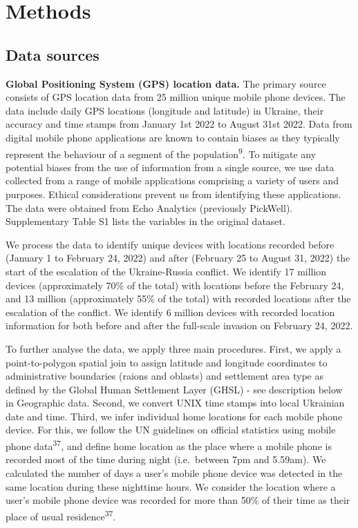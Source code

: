\documentclass[
  11pt,
]{article}
\begin{document}
\section{Methods}\label{methods}

\subsection{Data sources}\label{sec-data-sources}

\textbf{Global Positioning System (GPS) location data.} The primary
source consists of GPS location data from 25 million unique mobile phone
devices. The data include daily GPS locations (longitude and latitude)
in Ukraine, their accuracy and time stamps from January 1st 2022 to
August 31st 2022. Data from digital mobile phone applications are known
to contain biases as they typically represent the behaviour of a segment
of the population\textsuperscript{9}. To mitigate any potential biases
from the use of information from a single source, we use data collected
from a range of mobile applications comprising a variety of users and
purposes. Ethical considerations prevent us from identifying these
applications. The data were obtained from Echo Analytics (previously
PickWell). Supplementary Table S1 lists the variables in the original
dataset.

We process the data to identify unique devices with locations recorded
before (January 1 to February 24, 2022) and after (February 25 to August
31, 2022) the start of the escalation of the Ukraine-Russia conflict. We
identify 17 million devices (approximately 70\% of the total) with
locations before the February 24, and 13 million (approximately 55\% of
the total) with recorded locations after the escalation of the conflict.
We identify 6 million devices with recorded location information for
both before and after the full-scale invasion on February 24, 2022.

To further analyse the data, we apply three main procedures. First, we
apply a point-to-polygon spatial join to assign latitude and longitude
coordinates to administrative boundaries (raions and oblasts) and
settlement area type as defined by the Global Human Settlement Layer
(GHSL) - see description below in Geographic data. Second, we convert
UNIX time stamps into local Ukrainian date and time. Third, we infer
individual home locations for each mobile phone device. For this, we
follow the UN guidelines on official statistics using mobile phone
data\textsuperscript{37}, and define home location as the place where a
mobile phone is recorded most of the time during night (i.e.~between 7pm
and 5.59am). We calculated the number of days a user's mobile phone
device was detected in the same location during these nighttime hours.
We consider the location where a user's mobile phone device was recorded
for more than 50\% of their time as their place of usual
residence\textsuperscript{37}.
\end{document}

